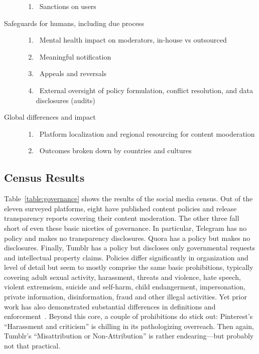 \begin{description}
\begin{enumerate}[resume]
        \item {}~Sanctions on users \label{itm:accounts}
    \end{enumerate}
\item[Safeguards for humans, including due process]\hfill
    \begin{enumerate}[resume]
        \item {}~Mental health impact on moderators,
            in-house vs outsourced \label{itm:mental-health}
        \item {}~Meaningful notification \label{itm:notification}
        \item {}~Appeals and reversals \label{itm:appeals}
        \item {}~External oversight of policy formulation, conflict
            resolution, and data disclosures (audits) \label{itm:oversight}
    \end{enumerate}
\item[Global differences and impact]\hfill
    \begin{enumerate}[resume]
        \item {}~Platform localization and regional
            resourcing for content mooderation \label{itm:resourcing}
        \item {}~Outcomes broken down by countries and
            cultures \label{itm:countries}
    \end{enumerate}
\end{description}


\subsection{Census Results}
\label{sec:census-results}

Table~\ref{table:governance} shows the results of the social media census. Out
of the eleven surveyed platforms, eight have published content policies and
release transparency reports covering their content moderation. The other three
fall short of even these basic niceties of governance. In particular, Telegram
has no policy and makes no transparency disclosures. Quora has a policy but
makes no disclosures. Finally, Tumblr has a policy but discloses only
governmental requests and intellectual property claims. Policies differ
significantly in organization and level of detail but seem to mostly comprise
the same basic prohibitions, typically covering adult sexual activity,
harassment, threats and violence, hate speech, violent extremsism, suicide and
self-harm, child endangerment, impersonation, private information,
disinformation, fraud and other illegal activities. Yet prior work has also
demonstrated substantial differences in definitions and
enforcement~\cite{FieslerJiangea2018,PaterKimea2016}. Beyond this core, a couple
of prohibitions do stick out: Pinterest's ``Harassment and criticism'' is
chilling in its pathologizing overreach. Then again, Tumblr's ``Misattribution
or Non-Attribution'' is rather endearing---but probably not that practical.

